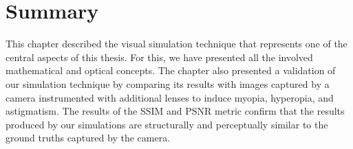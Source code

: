 		
\section{Summary}
%
This chapter described the visual simulation technique that represents one of the central aspects of this thesis. For this, we have presented all the  involved mathematical and optical concepts. The chapter also presented a validation of our simulation technique by comparing its results with images captured by a camera instrumented with additional lenses to induce myopia, hyperopia, and astigmatism. The results of the SSIM and PSNR metric confirm that the results produced by our simulations are structurally and perceptually similar to the ground truths captured by the camera.  
